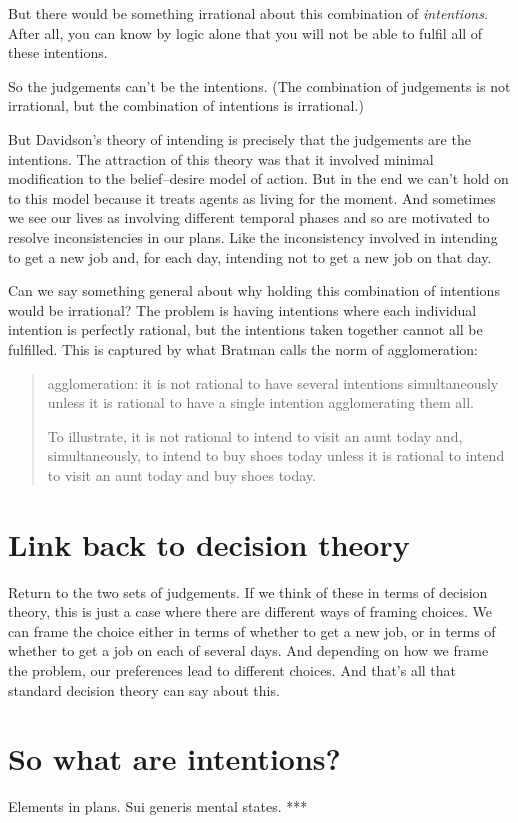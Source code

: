 \documentclass[12pt,\papersize]{extarticle}
\begin{document}
But there would be something irrational about this combination of \emph{intentions}.
After all, you can know by logic alone that you will not be able to fulfil all of these intentions.

So the judgements can't be the intentions.
(The combination of judgements is not irrational, but the combination of intentions is irrational.)

But Davidson's theory of intending is precisely that the judgements are the intentions.
The attraction of this theory was that it involved minimal modification to the belief--desire model of action.
But in the end we can't hold on to this model because it treats agents as living for the moment.
And sometimes we see our lives as involving different temporal phases and so are motivated to resolve inconsistencies in our plans. 
Like the inconsistency involved in intending to get a new job and, for each day, intending not to get a new job on that day.

Can we say something general about why holding this combination of intentions would be irrational? 
The problem is having intentions where each individual intention is perfectly rational, but the intentions taken together cannot all be fulfilled.
This is captured by what Bratman calls the norm of agglomeration:
%
\begin{quote}
agglomeration: it is not rational to have several intentions simultaneously unless it is rational to have a single intention agglomerating them all.  

To illustrate, it is not rational to intend to visit an aunt today and, simultaneously, to intend to buy shoes today unless it is rational to intend to visit an aunt today and buy shoes today.
\end{quote}


\section{Link back to decision theory}
Return to the two sets of judgements.
If we think of these in terms of decision theory, this is just a case where there are different ways of framing choices.
We can frame the choice either in terms of whether to get a new job, or in terms of whether to get a job on each of several days.
And depending on how we frame the problem, our preferences lead to different choices.
And that's all that standard decision theory can say about this.



\section{So what are intentions?}
Elements in plans.
Sui generis mental states.
***
\end{document}
